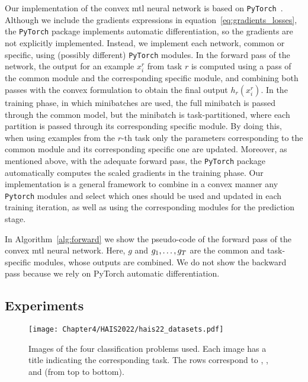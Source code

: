 Our implementation of the convex \acrshort{mtl} neural network is based on \texttt{PyTorch}~\citep{PyTorch}.
Although we include the gradients expressions in equation~\eqref{eq:gradients_losses}, the \texttt{PyTorch} package implements automatic differentiation, so the gradients are not explicitly implemented.
Instead, we implement each network, common or specific, using (possibly different) \texttt{PyTorch} modules.
In the forward pass of the network, the output for an example $x_i^r$ from task $r$ is computed using a pass of the common module and the corresponding specific module, and combining both passes with the convex formulation to obtain the final output $h_r(x_i^r)$.
In the training phase, in which minibatches are used, the full minibatch is passed through the common model, but the minibatch is task-partitioned, where each partition is passed through its corresponding specific module.
By doing this, when using examples from the $r$-th task only the parameters corresponding to the common module and its corresponding specific one are updated.
Moreover, as mentioned above, with the adequate forward pass, the \texttt{PyTorch} package automatically computes the scaled gradients in the training phase.
Our implementation is a general framework to combine in a convex manner any   \texttt{Pytorch} modules and select which ones should be used and updated in each training iteration, as well as using the corresponding modules for the prediction stage.

{In Algorithm~\ref{alg:forward} we show the pseudo-code of the forward pass of the convex \acrshort{mtl} neural network. Here, $g$ and $g_1, \ldots, g_T$ are the common and task-specific modules, whose outputs are combined. We do not show the backward pass because we rely on PyTorch automatic differentiation.}




\subsection{Experiments}

\begin{figure}[t!]
    \texttt{[image: Chapter4/HAIS2022/hais22\_datasets.pdf]}
    \caption{Images of the four classification problems used. Each image has a title indicating the corresponding task. The rows correspond to , ,  and  (from top to bottom).}
    \label{fig:problems_hais2022}
\end{figure}

